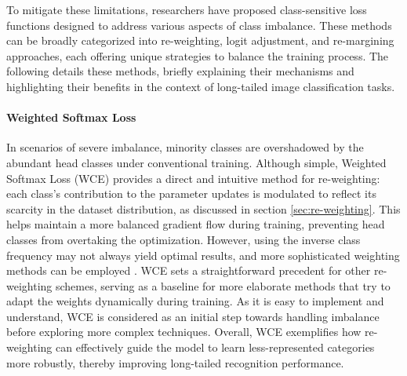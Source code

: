 To mitigate these limitations, researchers have proposed class-sensitive loss functions designed to address various aspects of class imbalance. These methods can be broadly categorized into re-weighting, logit adjustment, and re-margining approaches, each offering unique strategies to balance the training process. The following details these methods, briefly explaining their mechanisms and highlighting their benefits in the context of long-tailed image classification tasks.

\paragraph{Weighted Softmax Loss}
In scenarios of severe imbalance, minority classes are overshadowed by the abundant head classes under conventional training. Although simple, Weighted Softmax Loss (WCE) \cite{zhang2023deep} provides a direct and intuitive method for re-weighting: each class's contribution to the parameter updates is modulated to reflect its scarcity in the dataset distribution, as discussed in section \ref{sec:re-weighting}. This helps maintain a more balanced gradient flow during training, preventing head classes from overtaking the optimization. However, using the inverse class frequency may not always yield optimal results, and more sophisticated weighting methods can be employed \cite{zhang2023deep}. WCE sets a straightforward precedent for other re-weighting schemes, serving as a baseline for more elaborate methods that try to adapt the weights dynamically during training. As it is easy to implement and understand, WCE is considered as an initial step towards handling imbalance before exploring more complex techniques. Overall, WCE exemplifies how re-weighting can effectively guide the model to learn less-represented categories more robustly, thereby improving long-tailed recognition performance.

